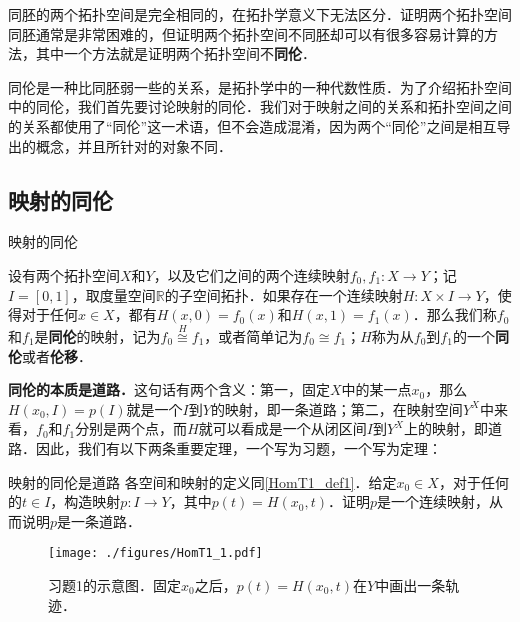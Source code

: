 

同胚的两个拓扑空间是完全相同的，在拓扑学意义下无法区分．证明两个拓扑空间同胚通常是非常困难的，但证明两个拓扑空间不同胚却可以有很多容易计算的方法，其中一个方法就是证明两个拓扑空间不\textbf{同伦}．

同伦是一种比同胚弱一些的关系，是拓扑学中的一种代数性质．为了介绍拓扑空间中的同伦，我们首先要讨论映射的同伦．我们对于映射之间的关系和拓扑空间之间的关系都使用了“同伦”这一术语，但不会造成混淆，因为两个“同伦”之间是相互导出的概念，并且所针对的对象不同．

\subsection{映射的同伦}

\begin{definition}{映射的同伦}\label{HomT1_def1}

设有两个拓扑空间$X$和$Y$，以及它们之间的两个连续映射$f_0, f_1:X\rightarrow Y$；记$I=[0, 1]$，取度量空间$\mathbb{R}$的子空间拓扑．如果存在一个连续映射$H: X\times I\rightarrow Y$，使得对于任何$x\in X$，都有$H(x, 0)=f_0(x)$和$H(x, 1)=f_1(x)$．那么我们称$f_0$和$f_1$是\textbf{同伦}的映射，记为$f_0\overset{H}{\cong} f_1$，或者简单记为$f_0\cong f_1$；$H$称为从$f_0$到$f_1$的一个\textbf{同伦}或者\textbf{伦移}．

\end{definition}

\textbf{同伦的本质是道路．}这句话有两个含义：第一，固定$X$中的某一点$x_0$，那么$H(x_0, I)=p(I)$就是一个$I$到$Y$的映射，即一条道路；第二，在映射空间$Y^X$中来看，$f_0$和$f_1$分别是两个点，而$H$就可以看成是一个从闭区间$I$到$Y^X$上的映射，即道路．因此，我们有以下两条重要定理，一个写为习题，一个写为定理：

\begin{exercise}{映射的同伦是道路}
各空间和映射的定义同\autoref{HomT1_def1}．给定$x_0\in X$，对于任何的$t\in I$，构造映射$p:I\rightarrow Y$，其中$p(t)=H(x_0, t)$．证明$p$是一个连续映射，从而说明$p$是一条道路．
\end{exercise}

\begin{figure}[ht]
\centering
\texttt{[image: ./figures/HomT1\_1.pdf]}
\caption{习题1的示意图．固定$x_0$之后，$p(t)=H(x_0, t)$在$Y$中画出一条轨迹．} \label{HomT1_fig1}
\end{figure}

